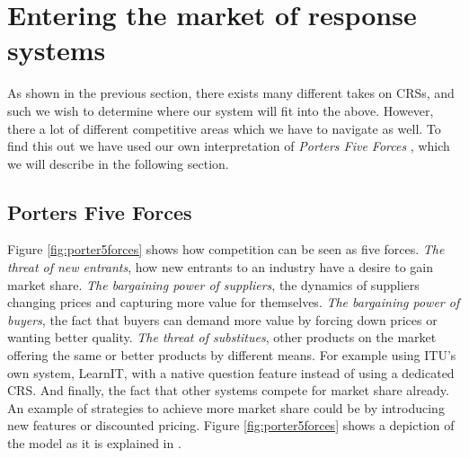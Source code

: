 \section{Entering the market of response systems}


As shown in the previous section, there exists many different takes on CRSs, and such we wish to determine where our system will fit into the above. However, there a lot of different competitive areas which we have to navigate as well. To find this out we have used our own interpretation of \emph{Porters Five Forces} \cite{porter1979competitive}, which we will describe in the following section. 


\subsection{Porters Five Forces}
Figure \ref{fig:porter5forces} shows how competition can be seen as five forces. 
\emph{The threat of new entrants}, how new entrants to an industry have a desire to gain market share. \emph{The bargaining power of suppliers}, the dynamics of suppliers changing prices and capturing more value for themselves. \emph{The bargaining power of buyers}, the fact that buyers can demand more value by forcing down prices or wanting better quality. \emph{The threat of substitues}, other products on the market offering the same or better products by different means. For example using ITU's own system, LearnIT, with a native question feature instead of using a dedicated CRS. And finally, the fact that other systems compete for market share already. An example of strategies to achieve more market share could be by introducing new features or discounted pricing. Figure \ref{fig:porter5forces} shows a depiction of the model as it is explained in .


